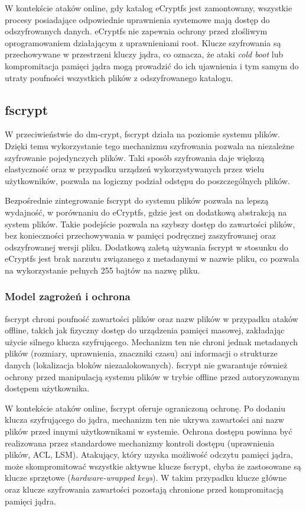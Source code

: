 \documentclass[a4paper]{article}
\begin{document}
W kontekście ataków online, gdy katalog eCryptfs jest zamontowany, wszystkie procesy
posiadające odpowiednie uprawnienia systemowe mają dostęp do odszyfrowanych danych.
eCryptfs nie zapewnia ochrony przed złośliwym oprogramowaniem działającym z uprawnieniami
root. Klucze szyfrowania są przechowywane w przestrzeni kluczy jądra,  co oznacza, że ataki
\textit{cold boot} lub kompromitacja pamięci jądra mogą prowadzić do ich ujawnienia i tym samym
do utraty poufności wszystkich plików z odszyfrowanego katalogu.


\subsection{fscrypt}
W przeciwieństwie do dm-crypt, fscrypt działa na poziomie systemu plików. Dzięki temu
wykorzystanie tego mechanizmu szyfrowania pozwala na niezależne szyfrowanie pojedynczych
plików. Taki sposób szyfrowania daje większą elastyczność oraz w przypadku urządzeń
wykorzystywanych przez wielu użytkowników, pozwala na logiczny podział odstępu do
poszczególnych plików.

Bezpośrednie zintegrowanie fscrypt do systemu plików pozwala na lepszą wydajność,
w porównaniu do eCryptfs, gdzie jest on dodatkową abstrakcją na system plików. Takie
podejście pozwala na szybszy dostęp do zawartości plików, bez konieczności przechowywania
w pamięci podręcznej zaszyfrowanej oraz odszyfrowanej wersji pliku. Dodatkową zaletą
używania fscrypt w stosunku do eCryptfs jest brak narzutu związanego z metadanymi w nazwie
pliku, co pozwala na wykorzystanie pełnych 255 bajtów na nazwę pliku.

\subsubsection{Model zagrożeń i ochrona}
fscrypt chroni poufność zawartości plików oraz nazw plików w przypadku ataków offline,
takich jak fizyczny dostęp do urządzenia pamięci masowej, zakładając użycie silnego klucza
szyfrującego. Mechanizm ten nie chroni jednak metadanych plików (rozmiary, uprawnienia,
znaczniki czasu) ani informacji o strukturze danych (lokalizacja bloków niezaalokowanych).
fscrypt nie gwarantuje również ochrony przed manipulacją systemu plików w trybie offline
przed autoryzowanym dostępem użytkownika.

W kontekście ataków online, fscrypt oferuje ograniczoną ochronę. Po dodaniu klucza
szyfrującego do jądra, mechanizm ten nie ukrywa zawartości ani nazw plików przed innymi
użytkownikami w systemie. Ochrona dostępu powinna być realizowana przez standardowe
mechanizmy kontroli dostępu (uprawnienia plików, ACL, LSM). Atakujący, który uzyska
możliwość odczytu pamięci jądra, może skompromitować wszystkie aktywne klucze fscrypt,
chyba że zastosowane są klucze sprzętowe (\textit{hardware-wrapped keys}). W takim przypadku
klucze główne oraz klucze szyfrowania zawartości pozostają chronione przed kompromitacją pamięci
jądra.
\end{document}
